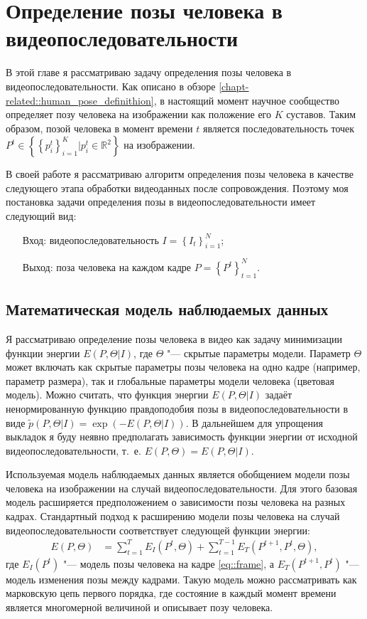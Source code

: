 \chapter{Определение позы человека в видеопоследовательности} \label{chapt6}

В этой главе я рассматриваю задачу определения позы человека в видеопоследовательности. Как описано в обзоре \ref{chapt-related::human_pose_definithion}, в настоящий момент научное сообщество определяет позу человека на изображении как положение его $K$ суставов. Таким образом, позой человека в момент времени $t$ является последовательность точек $P^t \in \left\{ \left\{p_i^t\right\}_{i=1}^K | p_i^t \in \mathbb{R}^2\right\}$ на изображении.

В своей работе я рассматриваю алгоритм определения позы человека в качестве следующего этапа обработки видеоданных после сопровождения. Поэтому моя постановка задачи определения позы в видеопоследовательности имеет следующий вид:
\begin{itemize}
	\item[Вход:] видеопоследовательность $I=\left\{I_t\right\}_{i=1}^N$;
	\item[Выход:] поза человека на каждом кадре $P=\left\{P^t\right\}_{t=1}^{N}$.
\end{itemize}

\section{Математическая модель наблюдаемых данных}

Я рассматриваю определение позы человека в видео как задачу минимизации функции энергии $E(P, \Theta|I)$, где $\Theta$ "--- скрытые параметры модели. Параметр $\Theta$ может включать как скрытые параметры позы человека на одно кадре (например, параметр размера), так и глобальные параметры модели человека (цветовая модель). Можно считать, что функция энергии $E(P, \Theta|I)$ задаёт ненормированную функцию правдоподобия позы в видеопоследовательности в виде $\tilde{p}(P, \Theta|I) = \exp\left(-E(P, \Theta|I)\right)$. В дальнейшем для упрощения выкладок я буду неявно предполагать зависимость функции энергии от исходной видеопоследовательности, т.~е. $E(P, \Theta) = E(P, \Theta|I)$.

Используемая модель наблюдаемых данных является обобщением модели позы человека на изображении на случай видеопоследовательности. Для этого базовая модель расширяется предположением о зависимости позы человека на разных кадрах. Стандартный подход к расширению модели позы человека на случай видеопоследовательности соответствует следующей функции энергии:
\begin{equation}
	\begin{aligned}
		E(P, \Theta) &= \sum_{t=1}^T E_I(P^t, \Theta) + \sum_{t=1}^{T-1}E_T(P^{t+1}, P^{t}, \Theta),
	\end{aligned}
\end{equation}
где $E_I(P^t)$ "--- модель позы человека на кадре \eqref{eq::frame}, а $E_T(P^{t+1}, P^{t})$ "--- модель изменения позы между кадрами. Такую модель можно рассматривать как марковскую цепь первого порядка, где состояние в каждый момент времени является многомерной величиной и описывает позу человека.

